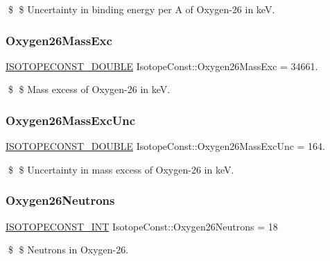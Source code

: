 \$ \$ Uncertainty in binding energy per A of Oxygen-\/26 in keV. \mbox{\label{group___isotope_const-_oxygen-_o26_ga6669bbcbc1a503cbf6b654fafdaae8d1}} 
\subsubsection{\texorpdfstring{Oxygen26\+Mass\+Exc}{Oxygen26MassExc}}
{\footnotesize\ttfamily \mbox{\hyperlink{group___isotope_const-_macros_ga8f45a7272ce02c0b4c65c44636ed719a}{I\+S\+O\+T\+O\+P\+E\+C\+O\+N\+S\+T\+\_\+\+D\+O\+U\+B\+LE}} Isotope\+Const\+::\+Oxygen26\+Mass\+Exc = 34661.}

\$ \$ Mass excess of Oxygen-\/26 in keV. \mbox{\label{group___isotope_const-_oxygen-_o26_ga1c5170853a176c27526e20ab8e673f05}} 
\subsubsection{\texorpdfstring{Oxygen26\+Mass\+Exc\+Unc}{Oxygen26MassExcUnc}}
{\footnotesize\ttfamily \mbox{\hyperlink{group___isotope_const-_macros_ga8f45a7272ce02c0b4c65c44636ed719a}{I\+S\+O\+T\+O\+P\+E\+C\+O\+N\+S\+T\+\_\+\+D\+O\+U\+B\+LE}} Isotope\+Const\+::\+Oxygen26\+Mass\+Exc\+Unc = 164.}

\$ \$ Uncertainty in mass excess of Oxygen-\/26 in keV. \mbox{\label{group___isotope_const-_oxygen-_o26_gac8293fde7f7e72dbfa3e8a09dafdc997}} 
\subsubsection{\texorpdfstring{Oxygen26\+Neutrons}{Oxygen26Neutrons}}
{\footnotesize\ttfamily \mbox{\hyperlink{group___isotope_const-_macros_ga5f18360b3e99483a35c32d789e62621c}{I\+S\+O\+T\+O\+P\+E\+C\+O\+N\+S\+T\+\_\+\+I\+NT}} Isotope\+Const\+::\+Oxygen26\+Neutrons = 18}

\$ \$ Neutrons in Oxygen-\/26. \mbox{\label{group___isotope_const-_oxygen-_o26_ga1c40665e5a089f34b4d474ef75a44170}} 
